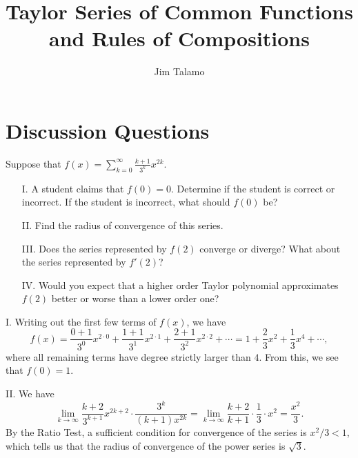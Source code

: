 \documentclass[]{ximera}
\author{Jim Talamo}
\title{Taylor Series of Common Functions and Rules of Compositions}
\begin{document}
\begin{abstract}
\end{abstract}
\maketitle

\vspace{-0.9in}

\section{Discussion Questions}

\begin{problem} 

Suppose that $\displaystyle f(x) = \sum_{k=0}^{\infty} \frac{k+1}{3^k}x^{2k}.$

\begin{itemize}
\item[I.] A student claims that $f(0)=0$.  Determine if the student is correct or incorrect.  If the student is incorrect, what should $f(0)$ be?
\item[II.] Find the radius of convergence of this series.
\item[III.] Does the series represented by $f(2)$ converge or diverge?  What about the series represented by $f'(2)$? 
\item[IV.] Would you expect that a higher order Taylor polynomial approximates $f(2)$ better or worse than a lower order one? 
\end{itemize}

\begin{solution}
I. Writing out the first few terms of $f(x)$, we have
$$
f(x)= \frac{0+1}{3^0}x^{2\cdot 0} + \frac{1+1}{3^1} x^{2\cdot 1}+ \frac{2+1}{3^2} x^{2 \cdot 2} + \cdots = 1 + \frac{2}{3}x^2 + \frac{1}{3}x^4 + \cdots,
$$
where all remaining terms have degree strictly larger than $4$. From this, we see that $f(0)=1$.

II. We have
$$
\lim_{k \rightarrow \infty} \frac{k+2}{3^{k+1}} x^{2k+2} \cdot \frac{3^k}{(k+1) x^{2k}}= \lim_{k \rightarrow \infty} \frac{k+2}{k+1} \cdot \frac{1}{3} \cdot x^2 = \frac{x^2}{3}.
$$
By the Ratio Test, a sufficient condition for convergence of the series is $x^2/3 < 1$, which tells us that the radius of convergence of the power series is $\sqrt{3}$.


\end{solution}
\end{problem}
\end{document}
